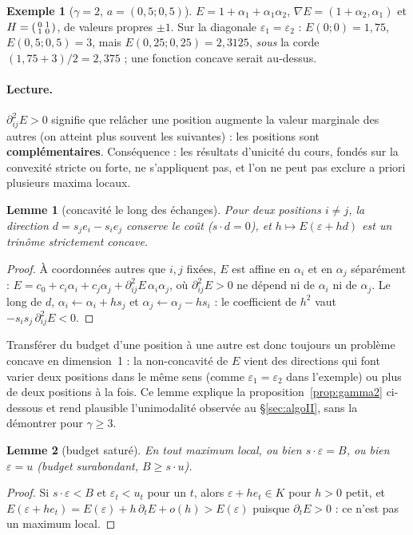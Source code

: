 \documentclass[11pt,a4paper]{article}
\theoremstyle{plain}
\newtheorem{lemme}{Lemme}
\theoremstyle{definition}
\newtheorem{exemple}{Exemple}
\begin{document}
\begin{exemple}[$\gamma=2$, $a=(0{,}5;0{,}5)$]
$E=1+\alpha_1+\alpha_1\alpha_2$, $\nabla E=(1+\alpha_2,\alpha_1)$ et $H=\begin{psmallmatrix}0&1\\1&0\end{psmallmatrix}$, de valeurs propres $\pm1$. Sur la diagonale $\varepsilon_1=\varepsilon_2$ : $E(0;0)=1{,}75$, $E(0{,}5;0{,}5)=3$, mais $E(0{,}25;0{,}25)=2{,}3125$, \emph{sous} la corde $(1{,}75+3)/2=2{,}375$ ; une fonction concave serait au-dessus.
\end{exemple}

\paragraph{Lecture.} $\partial^2_{ij}E>0$ signifie que relâcher une position augmente la valeur marginale des autres (on atteint plus souvent les suivantes) : les positions sont \textbf{complémentaires}. Conséquence : les résultats d'unicité du cours, fondés sur la convexité stricte ou forte, ne s'appliquent pas, et l'on ne peut pas exclure a priori plusieurs maxima locaux.

\begin{lemme}[concavité le long des échanges]\label{lem:echange}
Pour deux positions $i\ne j$, la direction $d=s_je_i-s_ie_j$ conserve le coût ($s\cdot d=0$), et $h\mapsto E(\varepsilon+hd)$ est un trinôme strictement concave.
\end{lemme}
\begin{proof}
À coordonnées autres que $i,j$ fixées, $E$ est affine en $\alpha_i$ et en $\alpha_j$ séparément : $E=c_0+c_i\alpha_i+c_j\alpha_j+\partial^2_{ij}E\,\alpha_i\alpha_j$, où $\partial^2_{ij}E>0$ ne dépend ni de $\alpha_i$ ni de $\alpha_j$. Le long de $d$, $\alpha_i\leftarrow\alpha_i+hs_j$ et $\alpha_j\leftarrow\alpha_j-hs_i$ : le coefficient de $h^2$ vaut $-s_is_j\,\partial^2_{ij}E<0$.
\end{proof}
Transférer du budget d'une position à une autre est donc toujours un problème concave en dimension~1 : la non-concavité de $E$ vient des directions qui font varier deux positions dans le même sens (comme $\varepsilon_1=\varepsilon_2$ dans l'exemple) ou plus de deux positions à la fois. Ce lemme explique la proposition~\ref{prop:gamma2} ci-dessous et rend plausible l'unimodalité observée au §\ref{sec:algoII}, sans la démontrer pour $\gamma\ge3$.

\begin{lemme}[budget saturé]\label{lem:sature}
En tout maximum local, ou bien $s\cdot\varepsilon=B$, ou bien $\varepsilon=u$ (budget surabondant, $B\ge s\cdot u$).
\end{lemme}
\begin{proof}
Si $s\cdot\varepsilon<B$ et $\varepsilon_t<u_t$ pour un $t$, alors $\varepsilon+he_t\in K$ pour $h>0$ petit, et $E(\varepsilon+he_t)=E(\varepsilon)+h\,\partial_tE+o(h)>E(\varepsilon)$ puisque $\partial_tE>0$ : ce n'est pas un maximum local.
\end{proof}
\end{document}
